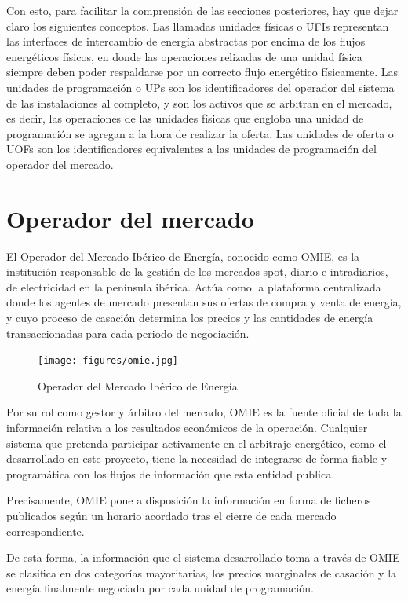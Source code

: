 Con esto, para facilitar la comprensión de las secciones posteriores, hay que dejar claro los siguientes conceptos. Las llamadas unidades físicas o UFIs representan las interfaces de intercambio de energía abstractas por encima de los flujos energéticos físicos, en donde las operaciones relizadas de una unidad física siempre deben poder respaldarse por un correcto flujo energético físicamente. Las unidades de programación o UPs son los identificadores del operador del sistema de las instalaciones al completo, y son los activos que se arbitran en el mercado, es decir, las operaciones de las unidades físicas que engloba una unidad de programación se agregan a la hora de realizar la oferta. Las unidades de oferta o UOFs son los identificadores equivalentes a las unidades de programación del operador del mercado.

\section{Operador del mercado}
\label{makereference4.1}

El Operador del Mercado Ibérico de Energía, conocido como OMIE, es la institución responsable de la gestión de los mercados spot, diario e intradiarios, de electricidad en la península ibérica. Actúa como la plataforma centralizada donde los agentes de mercado presentan sus ofertas de compra y venta de energía, y cuyo proceso de casación determina los precios y las cantidades de energía transaccionadas para cada periodo de negociación.

\begin{figure}
  \centering
  \texttt{[image: figures/omie.jpg]}
  \caption{Operador del Mercado Ibérico de Energía}
  \label{fig:omie}
\end{figure}

Por su rol como gestor y árbitro del mercado, OMIE es la fuente oficial de toda la información relativa a los resultados económicos de la operación. Cualquier sistema que pretenda participar activamente en el arbitraje energético, como el desarrollado en este proyecto, tiene la necesidad de integrarse de forma fiable y programática con los flujos de información que esta entidad publica.

Precisamente, OMIE pone a disposición la información en forma de ficheros publicados según un horario acordado tras el cierre de cada mercado correspondiente.

De esta forma, la información que el sistema desarrollado toma a través de OMIE se clasifica en dos categorías mayoritarias, los precios marginales de casación y la energía finalmente negociada por cada unidad de programación.

